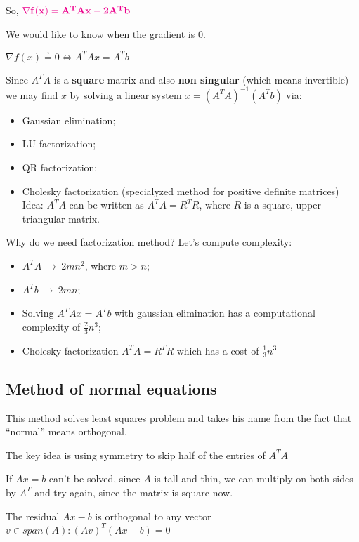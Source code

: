 \documentclass[computationalMathematics.tex]{subfiles}
\begin{document}
So, ${\bf \color{magenta} \nabla  f(x) = {A}^{T}Ax - 2{A}^{T}b}$

We would like to know when the gradient is $0$.

$\nabla  f(x) \questeq 0 \Leftrightarrow {A}^{T}Ax = {A}^{T}b$

Since ${A}^{T}A$ is a {\bf square} matrix and also {\bf non singular} (which means invertible) we may find $x$ by solving a linear system $x={({A}^{T}A)}^{-1}({A}^{T}b)$ via:

\begin{itemize}
  \item Gaussian elimination;
  \item LU factorization;
  \item QR factorization;
  \item Cholesky factorization (specialyzed method for positive definite matrices)
    Idea: ${A}^{T}A$ can be written as ${A}^{T}A={R}^{T}R$, where $R$ is a square, upper triangular matrix.
\end{itemize}

Why do we need factorization method?
Let's compute complexity:
\begin{itemize}
  \item ${A}^{T}A ~ \rightarrow ~ 2m{n}^{2}$, where $m>n$;
  \item ${A}^{T}b ~ \rightarrow ~ 2mn$;
  \item Solving ${A}^{T}Ax={A}^{T}b$ with gaussian elimination has a computational complexity of $\frac{2}{3}{n}^{3}$;
  \item Cholesky factorization ${A}^{T}A={R}^{T}R$ which has a cost of $\frac{1}{3}{n}^{3}$


\end{itemize}

\subsection{Method of normal equations}
This method solves least squares problem and takes his name from the fact that ``normal'' means orthogonal.

The key idea is using symmetry to skip half of the entries of ${A}^{T}A$

If $Ax=b$ can't be solved, since $A$ is tall and thin, we can multiply on both sides by ${A}^{T}$ and try again, since the matrix is square now.

The residual $Ax-b$ is orthogonal to any vector $v \in span(A): {(Av)}^{T} (Ax-b)=0$
\end{document}
